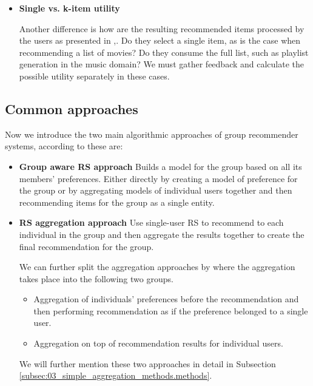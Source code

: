 \begin{itemize}
    \item \textbf{Single vs. k-item utility}
    
    Another difference is how are the resulting recommended items processed by the users as presented in \cite{xiao_2017_fairness_aware_g_rec},\cite{connor_2001_polylens_rec_for_groups}. Do they select a single item, as is the case when recommending a list of movies? Do they consume the full list, such as playlist generation in the music domain? We must gather feedback and calculate the possible utility separately in these cases.
\end{itemize}


\subsection{Common approaches}\label{subsec:01_group_rec_sys.common_aproaches}

Now we introduce the two main algorithmic approaches of group recommender systems, according to \cite{recommendations_to_groups-jameson2007} these are:
\begin{itemize}
    \item \textbf{Group aware RS approach}\newline
    Builds a model for the group based on all its members' preferences. Either directly by creating a model of preference for the group or by aggregating models of individual users together and then recommending items for the group as a single entity.
    \item \textbf{RS aggregation approach}\newline
    Use single-user RS to recommend to each individual in the group and then aggregate the results together to create the final recommendation for the group.
    
    We can further split the aggregation approaches by where the aggregation takes place into the following two groups.
    
    \begin{itemize}
        \item Aggregation of individuals' preferences before the recommendation and then performing recommendation as if the preference belonged to a single user.
        \item Aggregation on top of recommendation results for individual users.
    \end{itemize}
    
    We will further mention these two approaches in detail in Subsection \ref{subsec:03_simple_aggregation_methods.methods}.
    
    
    
\end{itemize}

